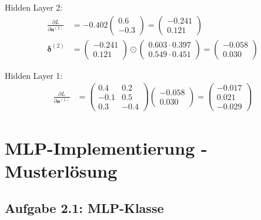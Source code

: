 ﻿\documentclass[12pt,a4paper]{article}
\begin{document}
Hidden Layer 2:
\begin{align}
\frac{\partial L}{\partial \mathbf{a}^{(2)}} &= -0.402 \begin{pmatrix} 0.6 \\ -0.3 \end{pmatrix} = \begin{pmatrix} -0.241 \\ 0.121 \end{pmatrix} \\
\boldsymbol{\delta}^{(2)} &= \begin{pmatrix} -0.241 \\ 0.121 \end{pmatrix} \odot \begin{pmatrix} 0.603 \cdot 0.397 \\ 0.549 \cdot 0.451 \end{pmatrix} = \begin{pmatrix} -0.058 \\ 0.030 \end{pmatrix}
\end{align}

Hidden Layer 1:
\begin{align}
\frac{\partial L}{\partial \mathbf{a}^{(1)}} &= \begin{pmatrix} 0.4 & 0.2 \\ -0.1 & 0.5 \\ 0.3 & -0.4 \end{pmatrix} \begin{pmatrix} -0.058 \\ 0.030 \end{pmatrix} = \begin{pmatrix} -0.017 \\ 0.021 \\ -0.029 \end{pmatrix}
\end{align}

\section{MLP-Implementierung - Musterlösung}

\subsection{Aufgabe 2.1: MLP-Klasse}
\end{document}
